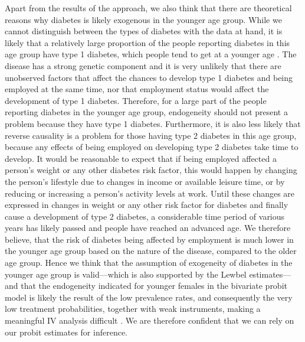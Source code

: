 Apart from the results of the \citeauthor{Lewbel2012} approach, we
also think that there are theoretical reasons why diabetes is likely
exogenous in the younger age group. While we cannot distinguish between
the types of diabetes with the data at hand, it is likely that a relatively
large proportion of the people reporting diabetes in this age group
have type 1 diabetes, which people tend to get at a younger age \parencite{Maahs2010}.
The disease has a strong genetic component and it is very unlikely
that there are unobserved factors that affect the chances to develop
type 1 diabetes and being employed at the same time, nor that employment
status would affect the development of type 1 diabetes. Therefore,
for a large part of the people reporting diabetes in the younger age
group, endogeneity should not present a problem because they have
type 1 diabetes. Furthermore, it is also less likely that reverse
causality is a problem for those having type 2 diabetes in this age
group, because any effects of being employed on developing type 2
diabetes take time to develop. It would be reasonable to expect that
if being employed affected a person's weight or any other diabetes
risk factor, this would happen by changing the person's lifestyle
due to changes in income or available leisure time, or by reducing
or increasing a person's activity levels at work. Until these changes
are expressed in changes in weight or any other risk factor for diabetes
and finally cause a development of type 2 diabetes, a considerable
time period of various years has likely passed and people have reached
an advanced age. We therefore believe, that the risk of diabetes being
affected by employment is much lower in the younger age group based
on the nature of the disease, compared to the older age group. Hence
we think that the assumption of exogeneity of diabetes in the younger
age group is valid---which is also supported by the Lewbel estimates---and that the endogeneity indicated for younger females in the
bivariate probit model is likely the result of the low prevalence
rates, and consequently the very low treatment probabilities, together
with weak instruments, making a meaningful \ac{IV} analysis difficult
\parencite{Chiburis2012}. We are therefore confident that we can rely
on our probit estimates for inference.

